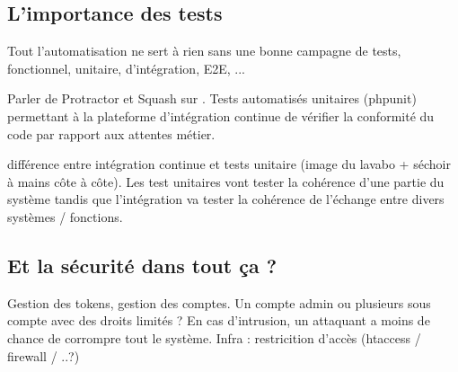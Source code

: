 \subsection{L'importance des tests}

Tout l'automatisation ne sert à rien sans une bonne campagne de tests, fonctionnel, unitaire, d'intégration, E2E, ...

Parler de Protractor et Squash sur \bv. Tests automatisés unitaires (phpunit) permettant à la plateforme d'intégration continue de vérifier la conformité du code par rapport aux attentes métier.

différence entre intégration continue et tests unitaire (image du lavabo + séchoir à mains côte à côte). Les test unitaires vont tester la cohérence d'une partie du système tandis que l'intégration va tester la cohérence de l'échange entre divers systèmes / fonctions.

\subsection{Et la sécurité dans tout ça ?}

Gestion des tokens, gestion des comptes.
Un compte admin ou plusieurs sous compte avec des droits limités ? En cas d'intrusion, un attaquant a moins de chance de corrompre tout le système.
Infra : restricition d'accès (htaccess / firewall / ..?)
